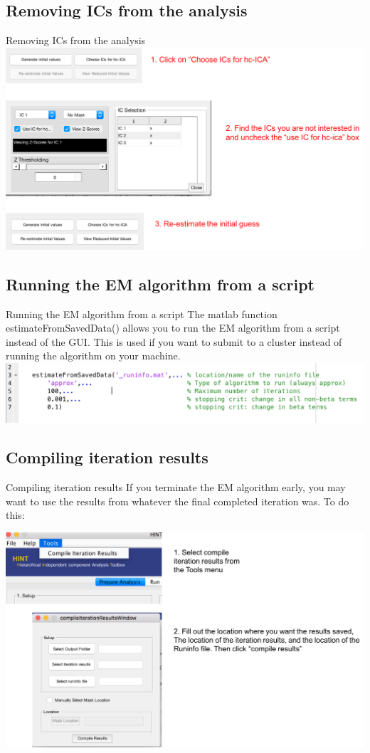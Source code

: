 \documentclass[11pt]{beamer}
\begin{document}
\subsection{Removing ICs from the analysis}

\begin{frame}{Removing ICs from the analysis}
\includegraphics[width=1\linewidth]{figs/removeICex}
 
\end{frame}

\subsection{Running the EM algorithm from a script}
\begin{frame}{Running the EM algorithm from a script}
The matlab function estimateFromSavedData() allows you to run the EM algorithm from a script instead of the GUI. This is used if you want to submit to a cluster instead of running the algorithm on your machine.
\includegraphics[width=1\linewidth]{figs/scriptVersion}
\end{frame}

\subsection{Compiling iteration results}
\begin{frame}{Compiling iteration results}
If you terminate the EM algorithm early, you may want to use the results from whatever the final completed iteration was. To do this:

\includegraphics[width=1\linewidth]{figs/compileResultsExample}


\end{frame}
\end{document}
